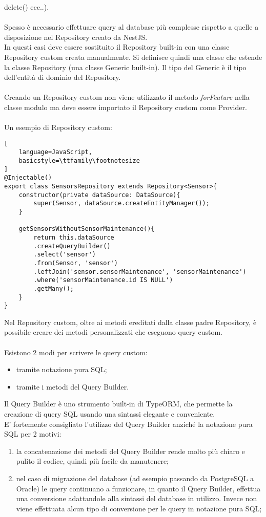 delete() ecc..).
\\\\
Spesso è necessario effettuare query al database più complesse rispetto a quelle a disposizione nel Repository
creato da NestJS. 
\\
In questi casi deve essere sostituito il Repository built-in con una classe Repository custom creata manualmente. 
Si definisce quindi una classe che
estende la classe Repository (una
classe Generic built-in). Il tipo del Generic è il tipo dell'entità di dominio 
del Repository.
\\\\
Creando un Repository custom non viene utilizzato il metodo \textit{forFeature} nella classe modulo ma deve essere importato il Repository custom
come Provider.
\\\\ 
Un esempio di Repository custom:
\begin{lstlisting}[
    language=JavaScript,
    basicstyle=\ttfamily\footnotesize
]
@Injectable()
export class SensorsRepository extends Repository<Sensor>{
    constructor(private dataSource: DataSource){
        super(Sensor, dataSource.createEntityManager());
    }

    getSensorsWithoutSensorMaintenance(){
        return this.dataSource
        .createQueryBuilder()
        .select('sensor')
        .from(Sensor, 'sensor')
        .leftJoin('sensor.sensorMaintenance', 'sensorMaintenance')
        .where('sensorMaintenance.id IS NULL')
        .getMany();
    }
}
\end{lstlisting}
\leavevmode\newline
Nel Repository custom, oltre ai metodi ereditati dalla classe padre Repository, è possibile creare dei metodi personalizzati
che eseguono query custom. 
\\\\
Esistono 2 modi per scrivere le query custom:
\begin{itemize}
    \item tramite notazione pura SQL;
    \item tramite i metodi del Query Builder.
\end{itemize}
\leavevmode\newline
Il Query Builder è uno strumento built-in di TypeORM, che permette la creazione di query SQL usando una sintassi elegante e conveniente.
\\
E' fortemente consigliato l'utilizzo del Query Builder anziché la notazione pura SQL per 2 motivi:
\begin{enumerate}
    \item la concatenazione dei metodi del Query Builder rende molto più chiaro e pulito il codice, quindi più facile
        da manutenere;
    \item nel caso di migrazione del database (ad esempio passando da PostgreSQL a Oracle) le query continuano a funzionare, in 
        quanto il Query Builder,
        effettua una conversione adattandole alla sintassi del database in utilizzo. Invece non viene 
        effettuata alcun tipo di conversione per le query in notazione pura SQL;
\end{enumerate}
